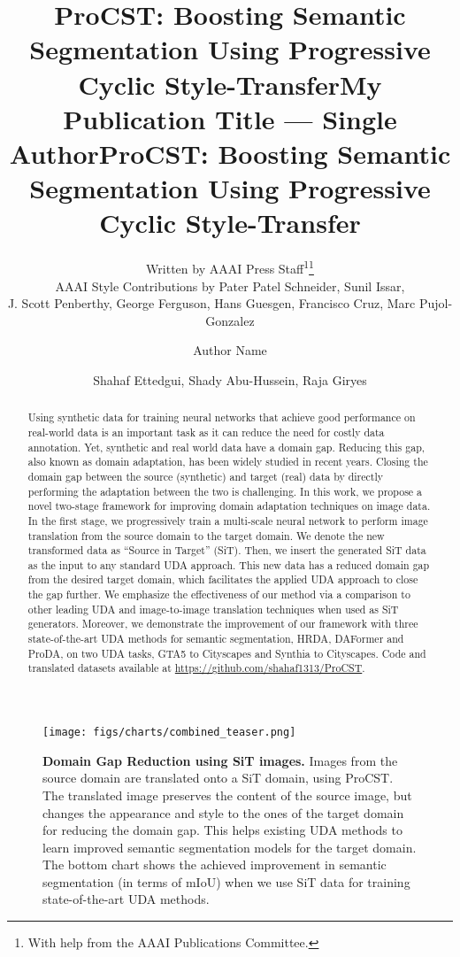 \documentclass[letterpaper]{article} \usepackage[]{aaai23}  \usepackage{times}  \usepackage{helvet}  \usepackage{courier}  \usepackage[hyphens]{url}  \usepackage{graphicx} \urlstyle{rm} \def\UrlFont{\rm}  \usepackage{natbib}  \usepackage{caption} \frenchspacing  \setlength{\pdfpagewidth}{8.5in} \setlength{\pdfpageheight}{11in} \usepackage{algorithm}
\title{ProCST: Boosting Semantic Segmentation Using Progressive Cyclic Style-Transfer}
\author{
Written by AAAI Press Staff\textsuperscript{\rm 1}\thanks{With help from the AAAI Publications Committee.}\\
    AAAI Style Contributions by Pater Patel Schneider,
    Sunil Issar,\\
    J. Scott Penberthy,
    George Ferguson,
    Hans Guesgen,
    Francisco Cruz\equalcontrib,
    Marc Pujol-Gonzalez\equalcontrib
}
\title{My Publication Title --- Single Author}
\author {
    Author Name
}
\title{ProCST: Boosting Semantic Segmentation Using Progressive Cyclic Style-Transfer}
\author {
Shahaf Ettedgui,
    Shady Abu-Hussein,
    Raja Giryes 
}
\begin{document}
\maketitle

\begin{abstract}
Using synthetic data for training neural networks that achieve good performance on real-world data is an important task as it can reduce the need for costly data annotation. Yet, synthetic and real world data have a domain gap. Reducing this gap, also known as domain adaptation, has been widely studied in recent years.
Closing the domain gap between the source (synthetic) and target (real) data by directly performing the adaptation between the two is challenging. In this work, we propose a novel two-stage framework for improving domain adaptation techniques on image data. In the first stage, we progressively train a multi-scale neural network to perform image translation from the source domain to the target domain.
We denote the new transformed data as ``Source in Target'' (SiT). Then, we insert the generated SiT data as the input to any standard UDA approach. This new data has a reduced domain gap from the desired target domain, which facilitates the applied UDA approach to close the gap further. We emphasize the effectiveness of our method via a comparison to other leading UDA and image-to-image translation techniques when used as SiT generators. Moreover, we demonstrate the improvement of our framework with three state-of-the-art UDA methods for semantic segmentation, HRDA, DAFormer and ProDA, on two UDA tasks, GTA5 to Cityscapes and Synthia to Cityscapes.
Code and translated datasets available at \url{https://github.com/shahaf1313/ProCST}.
\end{abstract}

\begin{figure}[t!]
    \centering
    \texttt{[image: figs/charts/combined\_teaser.png]}
    \caption{{\bf Domain Gap Reduction using SiT images.} Images from the source domain are translated onto a SiT domain, using ProCST. The translated image preserves the content of the source image, but changes the appearance and style to the ones of the target domain for reducing the domain gap. This helps existing UDA methods to learn improved semantic segmentation models for the target domain. The bottom chart shows the achieved improvement in semantic segmentation (in terms of mIoU) when we use SiT data for training state-of-the-art UDA methods.}
    \label{fig:procst_teaser}
\end{figure}
\end{document}
